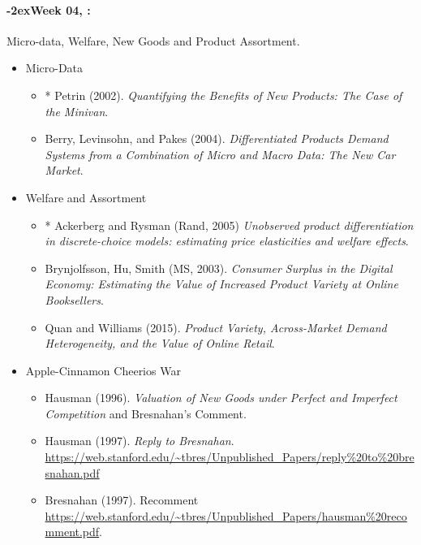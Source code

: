 \documentclass[11pt]{article}
\newcommand{\week}[1]{%
  \paragraph*{\kern-2ex\quad #1, \syldate{\today}:}%
  \ifdim\wd1=\wd\THURSDAY
    \AdvanceDate[7]
  \else
    \AdvanceDate[7]
  \fi%
}
\begin{document}
\week{Week 04} Micro-data, Welfare, New Goods and Product Assortment.
\begin{itemize}
\item Micro-Data
\begin{itemize}
\item * Petrin (2002). \textit{Quantifying the Benefits of New Products: The Case of the Minivan}.
\item Berry, Levinsohn, and Pakes (2004). \textit{Differentiated Products Demand Systems from a Combination of Micro and Macro Data: The New Car Market}.
\end{itemize}
\item Welfare and Assortment
\begin{itemize}
\item * Ackerberg and Rysman (Rand, 2005) \textit{Unobserved product differentiation in discrete-choice models: estimating price elasticities and welfare effects}.
\item Brynjolfsson, Hu, Smith (MS, 2003). \textit{Consumer Surplus in the Digital Economy: Estimating the Value of Increased Product Variety at Online Booksellers}.
\item Quan and Williams (2015). \textit{Product Variety, Across-Market Demand Heterogeneity, and the Value of Online Retail}.
\end{itemize}
\item Apple-Cinnamon Cheerios War
\begin{itemize}
\item Hausman (1996). \textit{Valuation of New Goods under Perfect and Imperfect Competition} and Bresnahan's Comment.
\item Hausman (1997). \textit{Reply to Bresnahan}. \url{https://web.stanford.edu/~tbres/Unpublished_Papers/reply%20to%20bresnahan.pdf}
\item Bresnahan (1997). Recomment \url{https://web.stanford.edu/~tbres/Unpublished_Papers/hausman%20recomment.pdf}.
\end{itemize}
\end{itemize}
\end{document}
